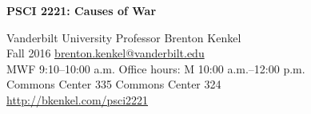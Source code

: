 \documentclass[12pt,svgnames]{article}
\begin{document}
{\Huge \textsf{\textbf{PSCI 2221: Causes of War}}}

\textsf{%
  Vanderbilt University \hfill Professor Brenton Kenkel \\
  Fall 2016 \hfill \href{mailto:brenton.kenkel@vanderbilt.edu}{brenton.kenkel@vanderbilt.edu} \\
  MWF 9:10--10:00 a.m. \hfill Office hours: M 10:00 a.m.--12:00 p.m. \\
  Commons Center 335 \hfill Commons Center 324 \\
  \url{http://bkenkel.com/psci2221}
}

\bigskip


\end{document}
